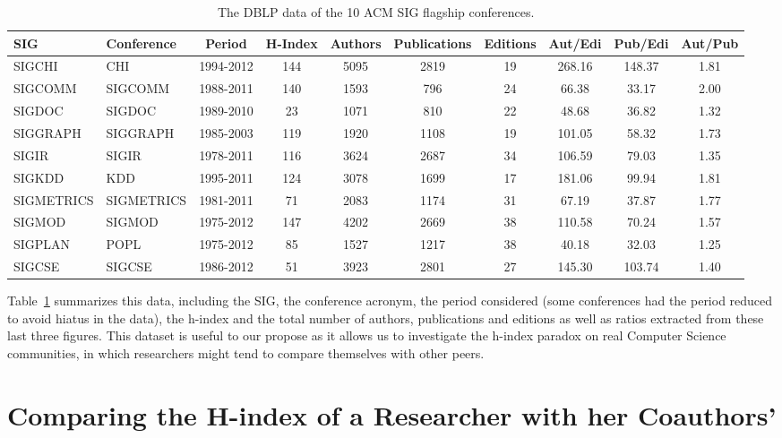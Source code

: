 \documentclass[letterpaper]{article}
\begin{document}
\begin{table}[t]
\centering
\caption{The DBLP data of the 10 ACM SIG flagship conferences.}
\label{tab:sigs_conference_period}
{\small
\begin{tabular}{|l|l|c|c|c|c|c|c|c|c|} \hline
SIG & Conference & Period & H-Index & Authors & Publications & Editions & Aut/Edi & Pub/Edi & Aut/Pub\\ \hline
SIGCHI & CHI & 1994-2012 & 144 & 5095 & 2819 & 19 & 268.16 & 148.37 & 1.81\\ \hline
SIGCOMM & SIGCOMM & 1988-2011 & 140 & 1593 & 796 & 24 & 66.38 & 33.17 & 2.00\\ \hline
SIGDOC & SIGDOC & 1989-2010 & 23 & 1071 & 810 & 22 & 48.68 & 36.82 & 1.32\\ \hline
SIGGRAPH & SIGGRAPH & 1985-2003 & 119 & 1920 & 1108 & 19 & 101.05 & 58.32 & 1.73\\ \hline
SIGIR & SIGIR & 1978-2011 & 116 & 3624 & 2687 & 34 & 106.59 & 79.03 & 1.35\\ \hline
SIGKDD & KDD & 1995-2011 & 124 & 3078 & 1699 & 17 & 181.06 & 99.94 & 1.81\\ \hline
SIGMETRICS & SIGMETRICS & 1981-2011 & 71 & 2083 & 1174 & 31 & 67.19 & 37.87 & 1.77\\ \hline
SIGMOD & SIGMOD & 1975-2012 & 147 & 4202 & 2669 & 38 & 110.58 & 70.24 & 1.57\\ \hline
SIGPLAN & POPL & 1975-2012 & 85 & 1527 & 1217 & 38 & 40.18 & 32.03 & 1.25\\ \hline
SIGCSE & SIGCSE & 1986-2012 & 51 & 3923 & 2801 & 27 & 145.30 & 103.74 & 1.40\\ \hline
\end{tabular}
}
\end{table}


Table~\ref{tab:sigs_conference_period} summarizes this data, including the SIG, the conference acronym, the period
considered (some conferences had the period reduced to avoid hiatus in the data), the h-index and the total number of authors, publications and editions as well as ratios extracted from these last three figures. This dataset is useful to our propose as it allows us to investigate the h-index paradox on real Computer Science communities, in which researchers might tend to compare themselves with other peers.


\section{Comparing the H-index of a Researcher with her Coauthors'}
\end{document}
